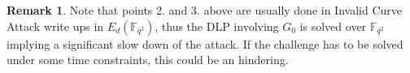 \documentclass[10pt]{article}
\theoremstyle{definition}
\newtheorem{remark}{Remark}
\newcommand{\F}{\mathbb{F}}
\begin{document}
\begin{remark}
Note that points 2. and 3. above are usually done in Invalid Curve Attack write ups in $E_d(\F_{q^2})$, thus the DLP involving $G_0$ is solved over $\F_{q^2}$ implying a significant slow down of the attack.
If the challenge has to be solved under some time constraints, this could be an hindering.
\end{remark}




\end{document}
